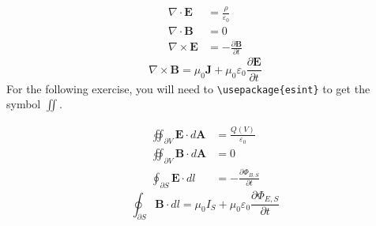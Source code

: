\documentclass{article}
\begin{document}
\begin{equation*}
\begin{aligned}
\nabla\cdot \mathbf{E}&=\frac{\rho}{\varepsilon_0} \\
\nabla\cdot \mathbf{B}&=0\\
\nabla\times \mathbf{E}&=-\frac{\partial \mathbf{B}}{\partial t}
\end{aligned}
\end{equation*}
\begin{equation}
\nabla \times \mathbf{B}
=\mu_0\mathbf{J}+\mu_0\varepsilon_0\frac{\partial \mathbf{E}}{\partial t}
\end{equation}
For the following exercise, you will need to \verb|\usepackage{esint}| to get the symbol $\iint$.

\begin{equation*}
\begin{aligned}
\oiint_{\partial V} \mathbf{E}\cdot d\mathbf{A}&=\frac{Q(V)}{\varepsilon_0} \\
\oiint_{\partial V} \mathbf{B}\cdot d\mathbf{A}&=0 \\
\oint_{\partial S} \mathbf{E}\cdot dl&=-\frac{\partial\Phi_{B,S}}{\partial t}
\end{aligned}
\end{equation*}
\begin{equation}
\oint_{\partial S} \mathbf{B}\cdot dl=\mu_0I_S+\mu_0\varepsilon_0\frac{\partial\Phi_{E,S}}{\partial t}
\end{equation}
\end{document}
